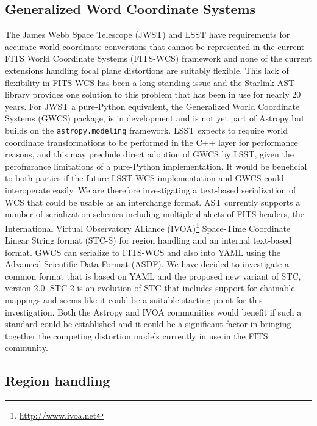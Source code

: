 \documentclass[]{spie}  %
\begin{document}
\subsection{Generalized Word Coordinate Systems}

The James Webb Space Telescope (JWST)\cite{2006SSRv..123..485G} and LSST have requirements for accurate world coordinate conversions that cannot be represented in the current FITS World Coordinate Systems (FITS-WCS) framework\cite{2013ASPC..475...49H,2002A&A...395.1077C,2015A&C....12..133T} and none of the current extensions handling focal plane distortions\cite{2012SPIE.8451E..1MS,2012tpv} are suitably flexible.
This lack of flexibility in FITS-WCS has been a long standing issue and the Starlink AST library\cite{Berry201633} provides one solution to this problem that has been in use for nearly 20 years.
For JWST a pure-Python equivalent, the Generalized World Coordinate Systems (GWCS) package, is in development\cite{2016_P028_adassxxv} and is not yet part of Astropy but builds on the \texttt{astropy.modeling} framework.
LSST expects to require world coordinate transformations to be performed in the C++ layer for performance reasons, and this may preclude direct adoption of GWCS by LSST, given the perofmrance limitations of a pure-Python implementation.
It would be beneficial to both parties if the future LSST WCS implementation and GWCS could interoperate easily.
We are therefore investigating a text-based serialization of WCS that could be usable as an interchange format.
AST currently supports a number of serialization schemes including multiple dialects of FITS headers, the International Virtual Observatory Alliance (IVOA)\footnote{\url{http://www.ivoa.net}} Space-Time Coordinate Linear String format (STC-S)\cite{2007ivoa.spec.1030R} for region handling\cite{2010ASPC..434..213B} and an internal text-based format.
GWCS can serialize to FITS-WCS and also into YAML\cite{2009yaml} using the Advanced Scientific Data Format (ASDF)\cite{2015A&C....12..240G}.
We have decided to investigate a common format that is based on YAML and the proposed new variant of STC, version 2.0.
STC-2\cite{2015ivoaSTC2} is an evolution of STC that includes support for chainable mappings and seems like it could be a suitable starting point for this investigation.
Both the Astropy and IVOA communities would benefit if such a standard could be established and it could be a significant factor in bringing together the competing distortion models currently in use in the FITS community.

\subsection{Region handling}
\end{document}
